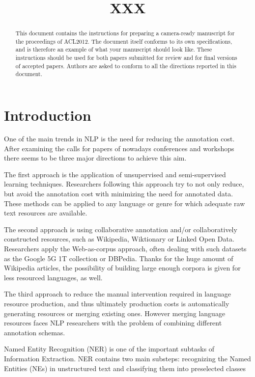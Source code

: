 \documentclass[11pt]{article}
\title{XXX}
\date{}
\begin{document}
\maketitle
\begin{abstract}
  This document contains the instructions for preparing a camera-ready manuscript for the proceedings of ACL2012. The document itself conforms to its own specifications, and is therefore an example of what your manuscript should look like. These instructions should be used for both papers submitted for review and for final versions of accepted papers. Authors are asked to conform to all the directions reported in this document.
\end{abstract}

\section{Introduction}

One of the main trends in NLP is the need for reducing the annotation cost. After examining the calls for papers of nowadays conferences and workshops there seems to be three major directions to achieve this aim. 

The first approach is the application of unsupervised and semi-supervised learning techniques. Researchers following this approach try to not only reduce, but avoid the annotation cost with minimizing the need for annotated data. These methods can be applied to any language or genre for which adequate raw text resources are available. 

The second approach is using collaborative annotation and/or collaboratively constructed resources, such as Wikipedia, Wiktionary or Linked Open Data. Researchers apply the Web-as-corpus approach, often dealing with such datasets as the Google 5G 1T collection or DBPedia. Thanks for the huge amount of Wikipedia articles, the possibility of building large enough corpora is given for less resourced languages, as well. 

The third approach to reduce the manual intervention required in language resource production, and thus ultimately production costs is automatically generating resources or merging existing ones. However merging language resources faces NLP researchers with the problem of combining different annotation schemas. 

Named Entity Recognition (NER) is one of the important subtasks of Information Extraction. NER contains two main substeps: recognizing the Named Entities (NEs) in unstructured text and classifying them into preselected classes
\end{document}
